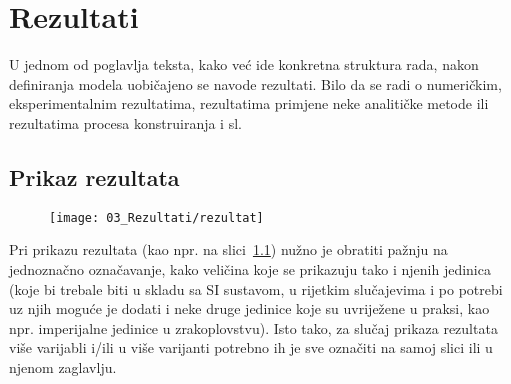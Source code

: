 \chapter{Rezultati}
U jednom od poglavlja teksta, kako već ide konkretna struktura rada, nakon definiranja
modela uobičajeno se navode rezultati. Bilo da se radi o numeričkim,
eksperimentalnim rezultatima, rezultatima primjene neke analitičke metode ili
rezultatima procesa konstruiranja i sl.

\section{Prikaz rezultata}

\begin{figure}[H]
  \centering
  \texttt{[image: 03\_Rezultati/rezultat]}\\
  \label{fig:rez}
\end{figure}

Pri prikazu rezultata (kao npr. na slici~\ref{fig:rez}) nužno je obratiti pažnju na
jednoznačno označavanje, kako veličina koje se prikazuju tako i njenih
jedinica (koje bi trebale biti u skladu sa SI sustavom, u rijetkim slučajevima
i po potrebi uz njih moguće je dodati i neke druge 
jedinice koje su uvriježene u praksi, kao npr. imperijalne jedinice u
zrakoplovstvu). Isto tako, za slučaj prikaza rezultata više varijabli
i/ili u više varijanti potrebno ih je sve označiti na samoj slici ili u njenom
zaglavlju. 

%
%
